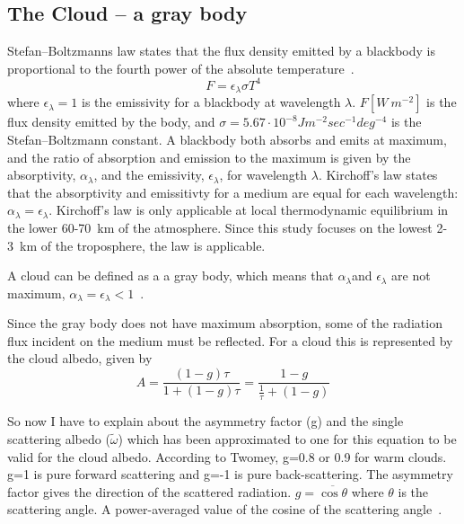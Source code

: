 \subsection{The Cloud -- a gray body}
Stefan–Boltzmanns law states that the flux density emitted by a blackbody is proportional to the fourth power of the absolute temperature~\citep{Liou2002}. 
\begin{equation}
F = \epsilon_{\lambda} \sigma T^4
\end{equation}
where $\epsilon_{\lambda} = 1$ is the emissivity for a blackbody at wavelength $\lambda$. $F [W~m^{-2}]$ is the flux density emitted  by the body, and $\sigma = 5.67\cdot 10^{-8} Jm^{-2}sec^{-1}deg^{-4}$ is the Stefan–Boltzmann constant. A blackbody both absorbs and emits at maximum, and the ratio of absorption and emission to the maximum is given by the absorptivity, $\alpha_{\lambda}$, and the emissivity, $\epsilon_{\lambda}$, for wavelength $\lambda$. Kirchoff's law states that the absorptivity and emissitivty for a medium are equal for each wavelength: $\alpha_{\lambda} = \epsilon_{\lambda}$. Kirchoff's law is only applicable at local thermodynamic equilibrium in the lower 60-70~km of the atmosphere. Since this study focuses on the lowest 2-3~km of the troposphere, the law is applicable.

A cloud can be defined as a a gray body, which means that $\alpha_{\lambda}$and $\epsilon_{\lambda}$ are not maximum, $\alpha_{\lambda}=\epsilon_{\lambda}<1$~\citep{Liou2002}. %

Since the gray body does not have maximum absorption, some of the radiation flux incident on the medium must be reflected. For a cloud this is represented by the cloud albedo, given by
\begin{equation}
A = \frac{(1-g)\tau}{1+(1-g)\tau} = \frac{1-g}{\frac{1}{\tau}+(1-g)}
\end{equation}

So now I have to explain about the asymmetry factor (g) and the single scattering albedo ($\tilde{\omega}$) which has been approximated to one for this equation to be valid for the cloud albedo. According to Twomey, g=0.8 or 0.9 for warm clouds. g=1 is pure forward scattering and g=-1 is pure back-scattering. The asymmetry factor gives the direction of the scattered radiation. $g=\overline{\cos \theta}$ where $\theta$ is the scattering angle. A power-averaged value of the cosine of the scattering angle~\citep{Twomey1974}.

